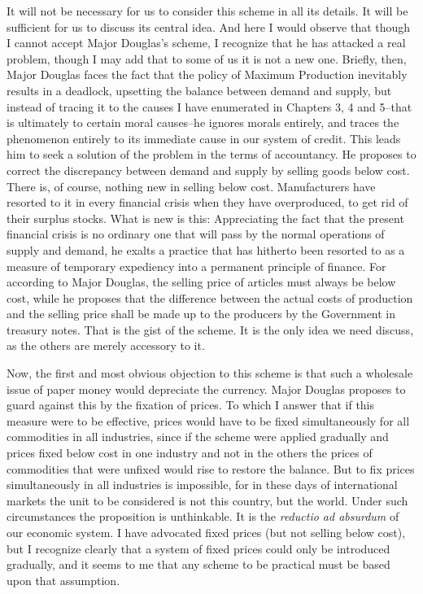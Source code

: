 \documentclass{book}
\begin{document}
It will not be necessary for us to consider this scheme in all its details. It will be sufficient for us to discuss its central idea. And here I would observe that though I cannot accept Major Douglas’s scheme, I recognize that he has attacked a real problem, though I may add that to some of us it is not a new one. Briefly, then, Major Douglas faces the fact that the policy of Maximum Production inevitably results in a deadlock, upsetting the balance between demand and supply, but instead of tracing it to the causes I have enumerated in Chapters 3, 4 and 5–that is ultimately to certain moral causes–he ignores morals entirely, and traces the phenomenon entirely to its immediate cause in our system of credit. This leads him to seek a solution of the problem in the terms of accountancy. He proposes to correct the discrepancy between demand and supply by selling goods below cost. There is, of course, nothing new in selling below cost. Manufacturers have resorted to it in every financial crisis when they have overproduced, to get rid of their surplus stocks. What is new is this: Appreciating the fact that the present financial crisis is no ordinary one that will pass by the normal operations of supply and demand, he exalts a practice that has hitherto been resorted to as a measure of temporary expediency into a permanent principle of finance. For according to Major Douglas, the selling price of articles must always be below cost, while he proposes that the difference between the actual costs of production and the selling price shall be made up to the producers by the Government in treasury notes. That is the gist of the scheme. It is the only idea we need discuss, as the others are merely accessory to it.

Now, the first and most obvious objection to this scheme is that such a wholesale issue of paper money would depreciate the currency. Major Douglas proposes to guard against this by the fixation of prices. To which I answer that if this measure were to be effective, prices would have to be fixed simultaneously for all commodities in all industries, since if the scheme were applied gradually and prices fixed below cost in one industry and not in the others the prices of commodities that were unfixed would rise to restore the balance. But to fix prices simultaneously in all industries is impossible, for in these days of international markets the unit to be considered is not this country, but the world. Under such circumstances the proposition is unthinkable. It is the \emph{reductio ad absurdum} of our economic system. I have advocated fixed prices (but not selling below cost), but I recognize clearly that a system of fixed prices could only be introduced gradually, and it seems to me that any scheme to be practical must be based upon that assumption.
\end{document}
